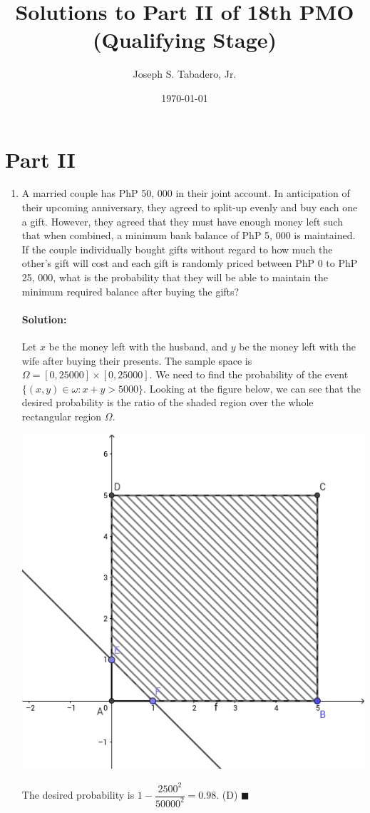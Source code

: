 \documentclass{article}
\title{Solutions to Part II of 18th PMO (Qualifying Stage)}
\author{Joseph S. Tabadero, Jr.}
\date{\today}
\newenvironment{solution}{\paragraph{Solution:}}{\hfill$\blacksquare$}
\begin{document}
	\maketitle
	
	
	\section*{Part II}
	
	\begin{enumerate}
		\item A married couple has PhP 50, 000 in their joint account. In anticipation of their upcoming
		anniversary, they agreed to split-up evenly and buy each one a gift. However, they agreed
		that they must have enough money left such that when combined, a minimum bank balance
		of PhP 5, 000 is maintained. If the couple individually bought gifts without regard to how
		much the other’s gift will cost and each gift is randomly priced between PhP 0 to PhP
		25, 000, what is the probability that they will be able to maintain the minimum required
		balance after buying the gifts?
		
		
		\begin{solution}
			Let $x$ be the money left with the husband, and $y$ be the money left with the wife after buying their presents. The sample space is $\Omega = [0,25000]\times [0,25000]$. We need to find the probability of the event $\{(x,y)\in \omega: x+y > 5000\}$. Looking at the figure below, we can see that the desired probability is the ratio of the shaded region over the whole rectangular region $\Omega$.
			
			\includegraphics[width=0.6\linewidth]{part3_1}
			
			The desired probability is $1-\dfrac{2500^2}{50000^2}=0.98$. (D)
		\end{solution}
	

\end{enumerate}
\end{document}
